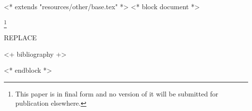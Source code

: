 <* extends "resources/other/base.tex" *>
<* block document *>
\subjclass[2010]{\docclasses}
\keywords{\dockeywords}



\title[\shorttitlename]{\titlename}
\author{<+ user.name +>}
\address{<+ user.institution +>, <+ user.address +>}
\thanks{This paper is in final form and no version of it will be submitted for publication elsewhere.}

\begin{abstract}
    REPLACE
\end{abstract}

\maketitle
\tableofcontents

REPLACE

<+ bibliography +>


<* endblock *>
